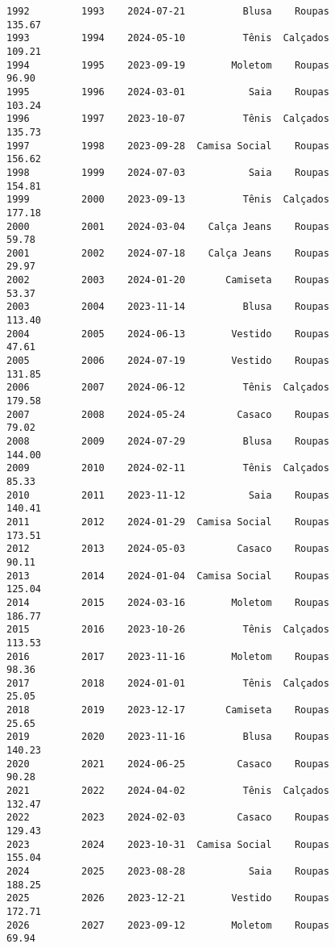 \documentclass[11pt]{article}
\begin{document}
\begin{Verbatim}[commandchars=\\\{\}]
1992         1993    2024-07-21          Blusa    Roupas          135.67   
1993         1994    2024-05-10          Tênis  Calçados          109.21   
1994         1995    2023-09-19        Moletom    Roupas           96.90   
1995         1996    2024-03-01           Saia    Roupas          103.24   
1996         1997    2023-10-07          Tênis  Calçados          135.73   
1997         1998    2023-09-28  Camisa Social    Roupas          156.62   
1998         1999    2024-07-03           Saia    Roupas          154.81   
1999         2000    2023-09-13          Tênis  Calçados          177.18   
2000         2001    2024-03-04    Calça Jeans    Roupas           59.78   
2001         2002    2024-07-18    Calça Jeans    Roupas           29.97   
2002         2003    2024-01-20       Camiseta    Roupas           53.37   
2003         2004    2023-11-14          Blusa    Roupas          113.40   
2004         2005    2024-06-13        Vestido    Roupas           47.61   
2005         2006    2024-07-19        Vestido    Roupas          131.85   
2006         2007    2024-06-12          Tênis  Calçados          179.58   
2007         2008    2024-05-24         Casaco    Roupas           79.02   
2008         2009    2024-07-29          Blusa    Roupas          144.00   
2009         2010    2024-02-11          Tênis  Calçados           85.33   
2010         2011    2023-11-12           Saia    Roupas          140.41   
2011         2012    2024-01-29  Camisa Social    Roupas          173.51   
2012         2013    2024-05-03         Casaco    Roupas           90.11   
2013         2014    2024-01-04  Camisa Social    Roupas          125.04   
2014         2015    2024-03-16        Moletom    Roupas          186.77   
2015         2016    2023-10-26          Tênis  Calçados          113.53   
2016         2017    2023-11-16        Moletom    Roupas           98.36   
2017         2018    2024-01-01          Tênis  Calçados           25.05   
2018         2019    2023-12-17       Camiseta    Roupas           25.65   
2019         2020    2023-11-16          Blusa    Roupas          140.23   
2020         2021    2024-06-25         Casaco    Roupas           90.28   
2021         2022    2024-04-02          Tênis  Calçados          132.47   
2022         2023    2024-02-03         Casaco    Roupas          129.43   
2023         2024    2023-10-31  Camisa Social    Roupas          155.04   
2024         2025    2023-08-28           Saia    Roupas          188.25   
2025         2026    2023-12-21        Vestido    Roupas          172.71   
2026         2027    2023-09-12        Moletom    Roupas           69.94   

\end{Verbatim}
\end{document}
